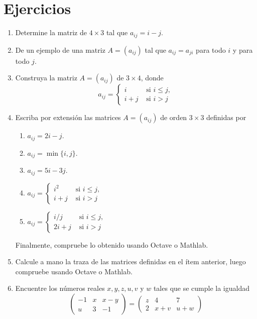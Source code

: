 \documentclass[12pt]{article}
\theoremstyle{exampstyle}
\theoremstyle{definition}
\theoremstyle{break}
\numberwithin{equation}{section}
\begin{document}
\section{Ejercicios}
\begin{enumerate}
    \item Determine la matriz de $4\times 3$ tal que $a_{ij}=i-j$.
    \item De un ejemplo de una matriz $A=(a_{ij})$ tal que $a_{ij}=a_{ji}$ para todo $i$ y para todo $j$.
    \item Construya la matriz $A = (a_{ij})$ de $3 \times 4$, donde
\[a_{ij}=\left\{\begin{array}{ll}
    i & \text{ si } i\leq j, \\
    i+j & \text{ si } i>j
\end{array}\right.\]
\item Escriba por extensi\'on las matrices $A=(a_{ij})$ de orden $3\times 3$ definidas por
\begin{enumerate}
    \item $a_{ij}=2i-j$.
    \item $a_{ij}=\min\{i,j\}.$
    \item $a_{ij}=5i-3j.$
    \item $a_{ij}=\left\{\begin{array}{ll}
    i^2 & \text{ si } i\leq j, \\
    i+j & \text{ si } i>j
\end{array}\right.$
    \item $a_{ij}=\left\{\begin{array}{ll}
    i/j & \text{ si } i\leq j, \\
    2i+j & \text{ si } i>j
\end{array}\right.$
\end{enumerate}
Finalmente, compruebe lo obtenido usando Octave o Mathlab.
\item Calcule a mano la traza de las matrices definidas en el ítem anterior, luego compruebe usando Octave o Mathlab.

\item Encuentre los n\'umeros reales $x,y,z,u,v$ y $w$ tales que se cumple la igualdad
\[\begin{pmatrix}
   -1& x& x-y \\
  u&3&-1
\end{pmatrix}=\begin{pmatrix}
   z& 4& 7 \\
  2&x+v&u+w
\end{pmatrix}\]


\end{enumerate}
\end{document}
